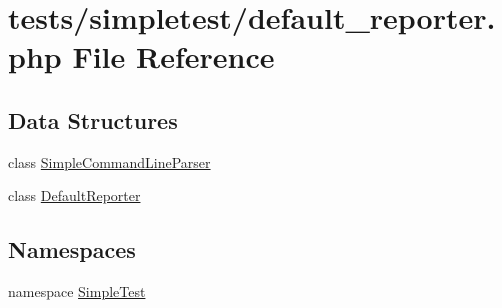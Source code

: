 \hypertarget{default__reporter_8php}{\section{tests/simpletest/default\-\_\-reporter.php File Reference}
\label{default__reporter_8php}
}
\subsection*{Data Structures}
\begin{DoxyCompactItemize}
\item 
class \hyperlink{class_simple_command_line_parser}{Simple\-Command\-Line\-Parser}
\item 
class \hyperlink{class_default_reporter}{Default\-Reporter}
\end{DoxyCompactItemize}
\subsection*{Namespaces}
\begin{DoxyCompactItemize}
\item 
namespace \hyperlink{namespace_simple_test}{Simple\-Test}
\end{DoxyCompactItemize}
